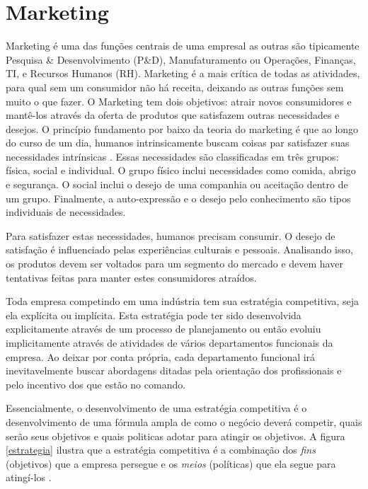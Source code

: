 \chapter{Marketing}

Marketing é uma das funções centrais de uma empresal as outras são tipicamente
Pesquisa \& Desenvolvimento (P\&D), Manufaturamento ou Operações, Finanças, TI,
e Recursos Humanos (RH).  Marketing é a mais crítica de todas as atividades,
para qual sem um consumidor não há receita, deixando as outras funções sem
muito o que fazer.   O Marketing tem dois 
objetivos: atrair novos consumidores e mantê-los através da oferta de
produtos que satisfazem outras necessidades e desejos.  O princípio fundamento
por baixo da teoria do marketing é que ao longo do curso de um dia, humanos 
intrinsicamente buscam coisas par satisfazer suas necessidades intrínsicas
\cite{moore2010marketing}. %
Essas necessidades são classificadas em três grupos: física, social
e individual.  O grupo físico inclui necessidades como comida, abrigo e
segurança.  O social inclui o desejo de uma companhia ou aceitação dentro
de um grupo.  Finalmente, a auto-expressão e o desejo pelo conhecimento são 
tipos individuais de necessidades.

Para satisfazer estas necessidades, humanos precisam consumir.  
O desejo de satisfação é influenciado pelas experiências culturais e
pessoais.  Analisando isso, os produtos devem ser voltados para um segmento do mercado e devem haver
tentativas feitas para manter estes consumidores atraídos.

Toda empresa competindo em uma indústria tem sua estratégia competitiva,
seja ela explícita ou implícita.   Esta estratégia pode ter sido desenvolvida
explicitamente através de um processo de planejamento ou então evoluiu
implicitamente através de atividades de vários departamentos funcionais da
empresa.   Ao deixar por conta própria, cada departamento funcional irá 
inevitavelmente buscar abordagens ditadas pela orientação dos profissionais
e pelo incentivo dos que estão no comando.

Essencialmente, o desenvolvimento de uma estratégia competitiva é o
desenvolvimento de uma fórmula ampla de como o negócio deverá competir,
quais serão seus objetivos e quais politicas adotar para atingir os objetivos.
A figura \ref{estrategia} ilustra que a estratégia competitiva é a combinação
dos \textit{fins} (objetivos) que a empresa persegue e os \textit{meios}
(políticas) que ela segue para atingí-los \cite{slack2009operations}.  

